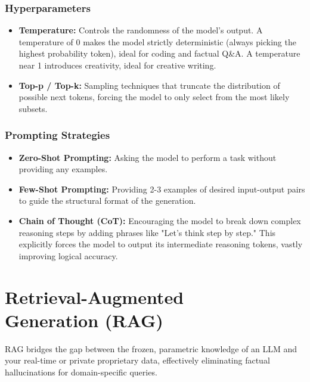 \documentclass[12pt,a4paper,oneside]{book}
\begin{document}
\subsection{Hyperparameters}
\begin{itemize}
    \item \textbf{Temperature:} Controls the randomness of the model's output. A temperature of 0 makes the model strictly deterministic (always picking the highest probability token), ideal for coding and factual Q\&A. A temperature near 1 introduces creativity, ideal for creative writing.
    \item \textbf{Top-p / Top-k:} Sampling techniques that truncate the distribution of possible next tokens, forcing the model to only select from the most likely subsets.
\end{itemize}

\subsection{Prompting Strategies}
\begin{itemize}
    \item \textbf{Zero-Shot Prompting:} Asking the model to perform a task without providing any examples.
    \item \textbf{Few-Shot Prompting:} Providing 2-3 examples of desired input-output pairs to guide the structural format of the generation.
    \item \textbf{Chain of Thought (CoT):} Encouraging the model to break down complex reasoning steps by adding phrases like "Let's think step by step." This explicitly forces the model to output its intermediate reasoning tokens, vastly improving logical accuracy.
\end{itemize}

\chapter[Retrieval-Augmented Generation]{Retrieval-Augmented\\Generation (RAG)}
RAG bridges the gap between the frozen, parametric knowledge of an LLM and your real-time or private proprietary data, effectively eliminating factual hallucinations for domain-specific queries.
\end{document}
